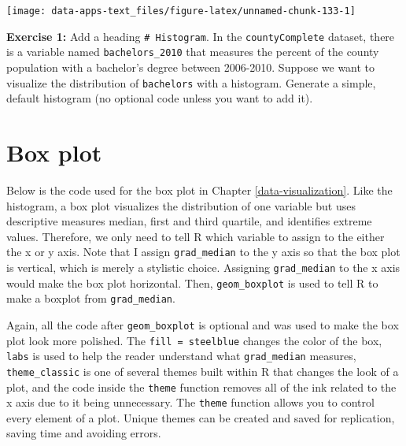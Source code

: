 \documentclass[
]{book}
\newenvironment{rmdblock}[1]
  {\begin{shaded*}
  }
  {\end{shaded*}
  }
\newenvironment{learncheck}
  {\begin{rmdblock}{warning}}
  {\end{rmdblock}}
\begin{document}
\begin{center}\texttt{[image: data-apps-text\_files/figure-latex/unnamed-chunk-133-1]} \end{center}

\begin{learncheck}
\textbf{Exercise 1:} Add a heading \texttt{\#\ Histogram}. In the
\texttt{countyComplete} dataset, there is a variable named
\texttt{bachelors\_2010} that measures the percent of the county
population with a bachelor's degree between 2006-2010. Suppose we want
to visualize the distribution of \texttt{bachelors} with a histogram.
Generate a simple, default histogram (no optional code unless you want
to add it).
\end{learncheck}

\hypertarget{box-plot}{%
\section{Box plot}\label{box-plot}}

Below is the code used for the box plot in Chapter \ref{data-visualization}. Like the histogram, a box plot visualizes the distribution of one variable but uses descriptive measures median, first and third quartile, and identifies extreme values. Therefore, we only need to tell R which variable to assign to the either the x or y axis. Note that I assign \texttt{grad\_median} to the y axis so that the box plot is vertical, which is merely a stylistic choice. Assigning \texttt{grad\_median} to the x axis would make the box plot horizontal. Then, \texttt{geom\_boxplot} is used to tell R to make a boxplot from \texttt{grad\_median}.

Again, all the code after \texttt{geom\_boxplot} is optional and was used to make the box plot look more polished. The \texttt{fill\ =\ \textquotesingle{}steelblue\textquotesingle{}} changes the color of the box, \texttt{labs} is used to help the reader understand what \texttt{grad\_median} measures, \texttt{theme\_classic} is one of several themes built within R that changes the look of a plot, and the code inside the \texttt{theme} function removes all of the ink related to the x axis due to it being unnecessary. The \texttt{theme} function allows you to control every element of a plot. Unique themes can be created and saved for replication, saving time and avoiding errors.
\end{document}
